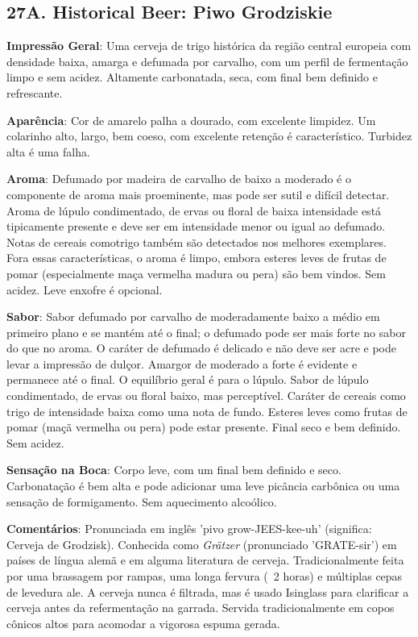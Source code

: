 \subsection*{27A. Historical Beer: Piwo Grodziskie}
\textbf{Impressão Geral}: Uma cerveja de trigo histórica da região central europeia com densidade baixa, amarga e defumada por carvalho, com um perfil de fermentação limpo e sem acidez. Altamente carbonatada, seca, com final bem definido e refrescante.

\textbf{Aparência}: Cor de amarelo palha a dourado, com excelente limpidez. Um colarinho alto, largo, bem coeso, com excelente retenção é característico. Turbidez alta é uma falha.

\textbf{Aroma}: Defumado por madeira de carvalho de baixo a moderado é o componente de aroma mais proeminente, mas pode ser sutil e difícil detectar. Aroma de lúpulo condimentado, de ervas ou floral de baixa intensidade está tipicamente presente e deve ser em intensidade menor ou igual ao defumado. Notas de cereais comotrigo também são detectados nos melhores exemplares. Fora essas características, o aroma é limpo, embora esteres leves de frutas de pomar (especialmente maça vermelha madura ou pera) são bem vindos. Sem acidez. Leve enxofre é opcional.

\textbf{Sabor}: Sabor defumado por carvalho de moderadamente baixo a médio em primeiro plano e se mantém até o final; o defumado pode ser mais forte no sabor do que no aroma. O caráter de defumado é delicado e não deve ser acre e pode levar a impressão de dulçor. Amargor de moderado a forte é evidente e permanece até o final. O equilíbrio geral é para o lúpulo. Sabor de lúpulo condimentado, de ervas ou floral baixo, mas perceptível. Caráter de cereais como trigo de intensidade baixa como uma nota de fundo. Esteres leves como frutas de pomar (maçã vermelha ou pera) pode estar presente. Final seco e bem definido. Sem acidez.

\textbf{Sensação na Boca}: Corpo leve, com um final bem definido e seco. Carbonatação é bem alta e pode adicionar uma leve picância carbônica ou uma sensação de formigamento. Sem aquecimento alcoólico.

\textbf{Comentários}: Pronunciada em inglês 'pivo grow-JEES-kee-uh' (significa: Cerveja de Grodzisk). Conhecida como \textit{Grätzer} (pronunciado 'GRATE-sir') em países de língua alemã e em alguma literatura de cerveja. Tradicionalmente feita por uma brassagem por rampas, uma longa fervura (~2 horas) e múltiplas cepas de levedura ale. A cerveja nunca é filtrada, mas é usado Isinglass para clarificar a cerveja antes da refermentação na garrada. Servida tradicionalmente em copos cônicos altos para acomodar a vigorosa espuma gerada.

